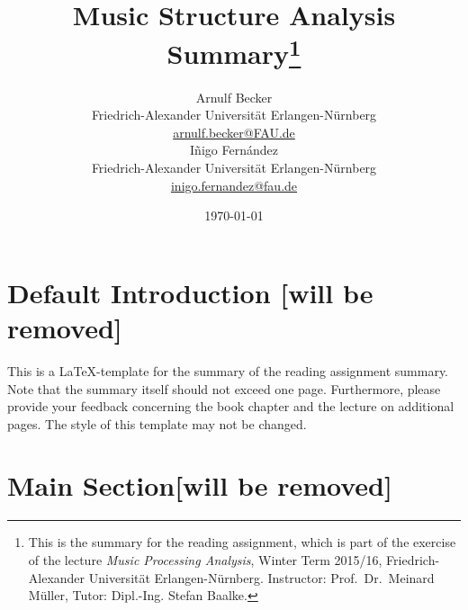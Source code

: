 \documentclass[a4paper, 9pt, twocolumn]{extarticle}
\begin{document}
\date{\normalsize \today}

\title{\vspace{-8mm}\textbf{\LARGE
Music Structure Analysis Summary\footnote{This is the summary for the reading assignment,
which is part of the exercise of the lecture \emph{Music Processing Analysis}, Winter Term 2015/16,
Friedrich-Alexander Universit\"at Erlangen-N\"urnberg.
Instructor: Prof.\ Dr.\ Meinard M\"uller,
Tutor: Dipl.-Ing. Stefan Baalke.
}}}

\author{
{
\begin{minipage}[t]{.45\textwidth}
\center
Arnulf Becker\\
\small
Friedrich-Alexander Universit\"at Erlangen-N\"urnberg
\protect\\{} %
\url{arnulf.becker@FAU.de}
\end{minipage}%
\begin{minipage}[t]{.45\textwidth}
\center
Iñigo Fern\' andez\\
\small
Friedrich-Alexander Universit\"at Erlangen-N\"urnberg
\protect\\{} %
\url{inigo.fernandez@fau.de}
\end{minipage}%
}
}
 
\maketitle
\thispagestyle{empty}

\section{Default Introduction [will be removed]}
\label{section:defaultIntroduction}

This is a \LaTeX-template for the summary of the reading assignment summary. Note that the summary
itself should not exceed one page. Furthermore, please provide your feedback concerning the 
book chapter and the lecture on additional pages.
The style of this template may not be changed.



\section{Main Section[will be removed]}
\label{section:main}
\end{document}

